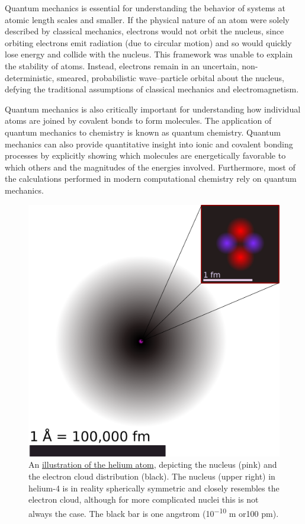 Quantum mechanics is essential for understanding the behavior of systems
at atomic length scales and smaller. If the physical nature of an atom
were solely described by classical mechanics, electrons would not orbit
the nucleus, since orbiting electrons emit radiation (due to circular
motion) and so would quickly lose energy and collide with the nucleus.
This framework was unable to explain the stability of atoms. Instead,
electrons remain in an uncertain, non-deterministic, smeared,
probabilistic wave--particle orbital about the nucleus, defying the
traditional assumptions of classical mechanics and electromagnetism.

Quantum mechanics is also critically important for understanding how
individual atoms are joined by covalent bonds to form molecules. The
application of quantum mechanics to chemistry is known as quantum
chemistry. Quantum mechanics can also provide quantitative insight into
ionic and covalent bonding processes by explicitly showing which
molecules are energetically favorable to which others and the magnitudes
of the energies involved. Furthermore, most of the calculations
performed in modern computational chemistry rely on quantum mechanics.

\begin{figure}

{\centering \includegraphics[width=0.7\linewidth]{./figures/chemistry/Helium_atom_QM} 

}

\caption{An \href{https://commons.wikimedia.org/wiki/File:Helium_atom_QM.svg}{illustration of the helium atom}, depicting the nucleus (pink) and the electron cloud distribution (black). The nucleus (upper right) in helium-4 is in reality spherically symmetric and closely resembles the electron cloud, although for more complicated nuclei this is not always the case. The black bar is one angstrom (10\textsuperscript{−10} m or100 pm).}\label{fig:atomcartoon}
\end{figure}

